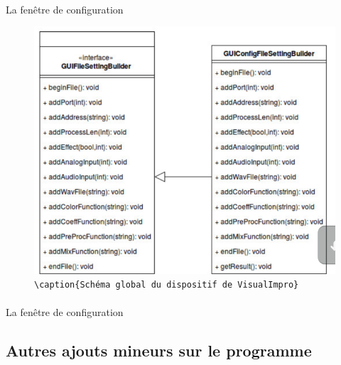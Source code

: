 \paragraph{}
La fenêtre de configuration

\begin{figure}[h]
 \centering
 \includegraphics[scale=0.5]{umlBuilder.png}
 \verb!\caption{Schéma global du dispositif de VisualImpro}!
 \label{schéma global}
\end{figure}

\paragraph{}
La fenêtre de configuration

\subsection{Autres ajouts mineurs sur le programme}
